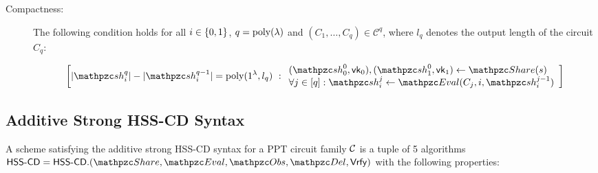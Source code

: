 \begin{description}
\item [Compactness:] The following condition holds for all $i \in
\{0,1\}$, $q = {\mathrm{poly}}(\lambda)$ and $(C_1, \ldots, C_q) \in
\mathcal{C}^q$, where $l_q$ denotes the output length of the circuit
$C_q$:

\begin{align}
\left[
|\qsh_i^q| - |\qsh_i^{q-1}| = \poly(1^\secp, l_q)
\ :
\begin{array}{ll}
(\qsh_0^0, \vk_0), (\qsh_1^0, \vk_1) \gets \Sh(s)\\
\forall j \in [q]: \qsh_i^j \leftarrow \Ev(C_j, i,
\qsh_i^{j-1})\\
\end{array}
\right]
\end{align}
\end{description}

\subsection{Additive Strong HSS-CD Syntax}

A scheme satisfying the additive strong HSS-CD syntax for a PPT
circuit family $\mathcal{C}$ is a tuple of 5 algorithms $\HSScd =
\HSScd.(\Sh, \Ev, \Obs, \Del, \Vrfy)$ with the following properties:

